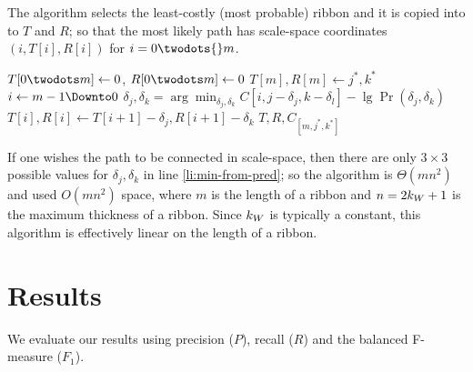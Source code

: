 The  algorithm selects the least-costly (most probable) ribbon and it is copied into to $T$ and $R$; so that the most likely path has scale-space coordinates $(i, T[i], R[i])$ for $i=0\twodots{}m$. 



\begin{codebox}
 \label{alg:backtrack-ribbon}
\li $T{[0{\twodots}m]} \gets 0$, \quad $R{[0{\twodots}m]} \gets 0$             
\li $T{[m]}, R{[m]} \gets j^*, k^*$ \label{li:backtrack-best-last}
\li \For $i \gets m-1 \Downto 0$ \Do
\li      $\delta_j, \delta_k = \displaystyle{\arg\min_{\delta_j,\delta_k}C{[i,j{-}\delta_j,k{-}\delta_l]}{-}\lg \Pr(\delta_j,\delta_k)}$
\li      $T{[i]}, R[i] \gets T{[i+1]}-\delta_j, R{[i+1]}-\delta_k$                                                 \label{li:backtack-choose-pred}
    \End
\li \Return $T, R, C_{[m, j^*, k^*]}$
\end{codebox}


If one wishes the path to be connected in scale-space, then there are only $3\times3$ possible values for $\delta_j, \delta_k$ in line \ref{li:min-from-pred}; so the algorithm is $\Theta(m n^2)$ and used $O(m n^2)$ space, where $m$ is the length of a ribbon and $n=2k_W+1$ is the maximum thickness of a ribbon. Since $k_W$ is typically a constant, this algorithm is effectively linear on the length of a ribbon. 



\section{Results}

We evaluate our results using precision ($P$), recall ($R$) and the balanced F-measure ($F_1$).

